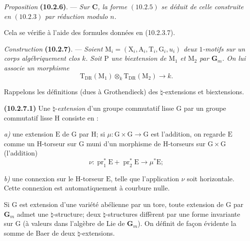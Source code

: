 \documentclass[11pt,leqno]{article}
\begin{document}
\textit{Proposition} \textbf{(10.2.6)}. — \textit{Sur
\(\mathbf{C}\), la forme \((10.2.5)\) se déduit de celle construite
en \((10.2.3)\) par réduction modulo \(n\).}

Cela se vérifie à l’aide des formules données en (10.2.3.7).

\textit{Construction} \textbf{(10.2.7)}. — \textit{Soient
\(\mathrm{M}_i=(\mathrm{X}_i,\mathrm{A}_i,\mathrm{T}_i,\mathrm{G}_i,u_i)\)
deux \(1\)-motifs sur un corps algébriquement clos \(k\).
Soit \(\mathrm{P}\) une biextension de \(\mathrm{M}_1\) et
\(\mathrm{M}_2\) par \(\mathbf{G}_m\).
On lui associe un morphisme}
\[
\mathrm{T}_{\mathrm{DR}}(\mathrm{M}_1)\otimes_k
\mathrm{T}_{\mathrm{DR}}(\mathrm{M}_2)\to k.
\]

Rappelons les définitions (dues à Grothendieck) des
\(\natural\)-extensions et biextensions.

\textbf{(10.2.7.1)} Une \(\natural\)-\textit{extension} d’un groupe
commutatif lisse \(\mathrm{G}\) par un groupe commutatif lisse
\(\mathrm{H}\) consiste en :

\noindent\textit{a)} une extension \(\mathrm{E}\) de \(\mathrm{G}\)
par \(\mathrm{H}\); si
\(\mu:\mathrm{G}\times\mathrm{G}\to\mathrm{G}\) est l’addition,
on regarde \(\mathrm{E}\) comme un \(\mathrm{H}\)-torseur sur
\(\mathrm{G}\) muni d’un morphisme de \(\mathrm{H}\)-torseurs sur
\(\mathrm{G}\times\mathrm{G}\) (l’addition)
\[
\nu:\operatorname{pr}_1^{*}\mathrm{E}
+\operatorname{pr}_2^{*}\mathrm{E}\to\mu^{*}\mathrm{E};
\]

\noindent\textit{b)} une connexion sur le \(\mathrm{H}\)-torseur
\(\mathrm{E}\), telle que l’application \(\nu\) soit horizontale.
Cette connexion est automatiquement à courbure nulle.

Si \(\mathrm{G}\) est extension d’une variété abélienne par un
tore, toute extension de \(\mathrm{G}\) par \(\mathbf{G}_m\)
admet une \(\natural\)-structure; deux \(\natural\)-structures
diffèrent par une forme invariante sur \(\mathrm{G}\) (à valeurs
dans l’algèbre de Lie de \(\mathbf{G}_m\)). On définit de façon
évidente la somme de Baer de deux \(\natural\)-extensions.
\end{document}
